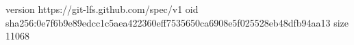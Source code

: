 version https://git-lfs.github.com/spec/v1
oid sha256:0e7f6b9e89edcc1c5aea422360eff7535650ca6908e5f025528eb48dfb94aa13
size 11068
